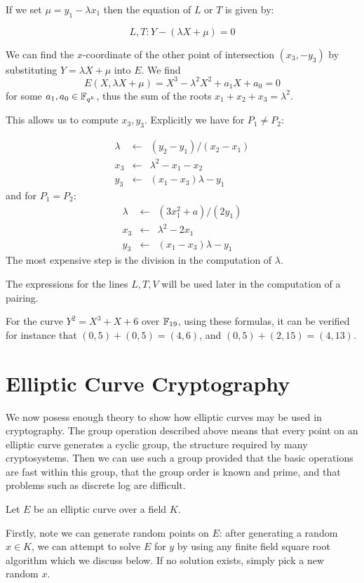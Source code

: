 If we set $\mu = y_1 - \lambda x_1$ then
the equation of $L$ or $T$ is given by:

\[ L, T :  Y - (\lambda X + \mu) = 0 \]

We can find the $x$-coordinate of the other point of intersection $(x_3, -y_3)$
by substituting $Y = \lambda X + \mu$ into $E$. We find
\[ E(X, \lambda X+\mu) = X^3 - \lambda^2 X^2 + a_1 X + a_0 = 0 \]
for some $a_1, a_0 \in \mathbb{F}_{q^k}$, thus the sum of the roots
$x_1 + x_2 + x_3 = \lambda^2$.

This allows us to compute $x_3, y_3$. Explicitly we have for $P_1 \ne P_2$:

\[
\begin{array}{rcl}
\lambda &\leftarrow& (y_2 - y_1)/(x_2 - x_1) \\
x_3 &\leftarrow& \lambda^2 - x_1 - x_2 \\
y_3 &\leftarrow& (x_1 - x_3) \lambda - y_1
\end{array}
\]
and for $P_1 = P_2$:
\[
\begin{array}{rcl}
\lambda &\leftarrow& (3x_1^2 + a)/(2y_1) \\
x_3 &\leftarrow& \lambda^2 - 2x_1 \\
y_3 &\leftarrow& (x_1 - x_3) \lambda - y_1
\end{array}
\]
The most expensive step is the division in the computation of
$\lambda$.

The expressions for the lines $L,T,V$ will be used later in the computation
of a pairing.

For the curve $Y^2 = X^3 + X + 6$ over $\mathbb{F}_{19}$,
using these formulas, it can be verified for instance that
$(0, 5) + (0, 5) = (4, 6)$,
and $(0, 5) + (2, 15) = (4, 13)$.

\section {Elliptic Curve Cryptography}

We now posess enough theory to show how elliptic curves may be used
in cryptography.
The group operation described above means that every point on an elliptic curve
generates a cyclic group, the structure required by many cryptosystems.
Then we can use such a group provided that the basic operations are
fast within this group, that the group order is known and prime,
and that problems such as discrete log are difficult.

Let $E$ be an elliptic curve over a field $K$.

Firstly, note we can generate random points on $E$:
after generating a random $x \in K$, we can attempt to solve $E$ for $y$ by
using any finite field square root algorithm which we discuss below.
If no solution exists, simply pick a new random $x$.

